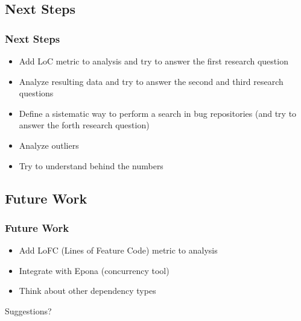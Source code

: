 \subsection{Next Steps}
\begin{frame}
	\frametitle{Next Steps}
	\begin{itemize}
		\item Add LoC metric to analysis and try to answer the first research question
		\item Analyze resulting data and try to answer the second and third research questions
		\item Define a sistematic way to perform a search in bug repositories (and try to answer the forth research question)
		\item Analyze outliers
		\item Try to understand behind the numbers
	\end{itemize}
\end{frame}

\subsection{Future Work}
\begin{frame}
	\frametitle{Future Work}
	\begin{itemize}
		\item Add LoFC (Lines of Feature Code) metric to analysis
		\item Integrate with Epona (concurrency tool)
		\item Think about other dependency types
	\end{itemize}
\end{frame}

\begin{frame}
	\begin{center}
		Suggestions?
	\end{center}
\end{frame}